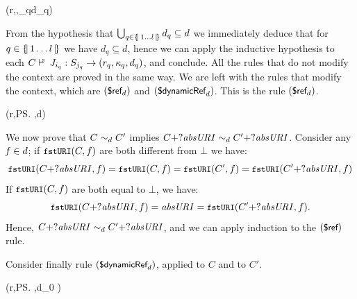 \begin{appendixproof}
{
 \Ret{r}
 {(r,,\bigcup_{q\in{}}d_q)}
}

From the hypothesis that $\bigcup_{q\in\{\!|\,{1\ldots{l}}\,|\!\}}d_q \subseteq d$
we immediately deduce that for $q\in\{\!|\,{1\ldots{l}}\,|\!\}$ we have $d_q \subseteq d$,
hence we can apply the inductive hypothesis to each
$\SJudg{C}{J_{i_q}}{S_{j_q}}\Ret{r_q}{(r_q,\ps_q,d_q)}$, and conclude.
All the rules that do not modify the context are proved in the same way.
We are left with the rules that modify the context, which are $(\mbox{\sf{\small \$ref}}_d)$ and $(\mbox{\sf{\small \$dynamicRef}}_d)$.
This is the rule $(\mbox{\sf{\small \$ref}}_d)$.

{%
 \KdJudg{C}{J}{\adref: \key{absURI}\catHash\key{f}}
 (r,\ps,d)
}

We now prove that ${C}\sim_{d}{C'}$ implies ${C+?\mathit{absURI}}\sim_{d}{C'+?\mathit{absURI}}$.
Consider any $\mathit{f}\in d$;
if $\mbox{\tt{\small fstURI}}(C,f)$ are both different from $\bot$ we have:
$$\mbox{\tt{\small fstURI}}(C+?\mathit{absURI},f) = 
\mbox{\tt{\small fstURI}}(C,f) = 
\mbox{\tt{\small fstURI}}(C',f) = 
\mbox{\tt{\small fstURI}}(C'+?\mathit{absURI},f) 
$$
If $\mbox{\tt{\small fstURI}}(C,f)$ are both equal to $\bot$, we have:
$$\mbox{\tt{\small fstURI}}(C+?\mathit{absURI},f) = 
\mathit{absURI} =
\mbox{\tt{\small fstURI}}(C'+?\mathit{absURI},f).
$$
Hence, ${C+?\mathit{absURI}}\sim_{d}{C'+?\mathit{absURI}}$, and we can apply induction to the $(\mbox{\sf{\small \$ref}})$ rule.

Consider finally rule $(\mbox{\sf{\small \$dynamicRef}}_d)$, applied to $C$ and to $C'$.

{%
 \KJudg{C}{J}{\addref: \key{absURI}\cat\qkw{\#}\cat\key{f}}
 (r,\ps,d_0 \cup {} )
}


\end{appendixproof}
